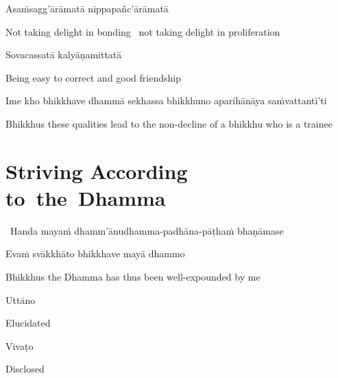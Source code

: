 Asaṁsagg'ārāmatā nippapañc'ārāmatā

\begin{english-hang}
  Not taking delight in bonding \breathmark\ not taking delight in proliferation
\end{english-hang}

Sovacassatā kalyāṇamittatā

\begin{english}
  Being easy to correct and good friendship
\end{english}

\begin{pali-hang}
  Ime kho bhikkhave dhammā sekhassa bhikkhuno aparihānāya saṁvattantī'ti
\end{pali-hang}

\begin{english-hang}
  Bhikkhus these qualities lead to the non-decline of a bhikkhu who is a trainee
\end{english-hang}

\suttaRef{[AN 6.22 \& AN 8.79]}

\ifdigital{}\fi



\section{Striving According \mbox{to}~the~Dhamma}
\label{striving-according-to-dhamma}

\begin{leader}
  \anglebracketleft\ \hspace{-0.5mm}Handa mayaṁ dhamm’ānudhamma-padhāna-pāṭhaṁ bhaṇāmase \hspace{-0.5mm}\anglebracketright\
\end{leader}
Evaṁ svākkhāto bhikkhave mayā dhammo

\begin{english-hang}
  Bhikkhus the Dhamma has thus been well-expounded by me
\end{english-hang}

Uttāno

\begin{english}
  Elucidated
\end{english}

Vivaṭo

\begin{english}
  Disclosed
\end{english}


